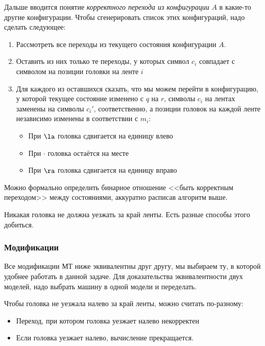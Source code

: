 	Дальше вводится понятие \textit{корректного перехода из конфигурации} $A$ в какие-то другие конфигурации.
	Чтобы сгенерировать список этих конфигураций, надо сделать следующее:
	\begin{enumerate}
		\item Рассмотреть все переходы из текущего состояния конфигурации $A$.
		\item Оставить из них только те переходы, у которых символ $c_i$ совпадает с символом на позиции головки на ленте $i$
		\item
			Для каждого из оставшихся сказать, что мы можем перейти в конфигурацию, у которой текущее состояние изменено с $q$ на $r$,
			символы $c_i$ на лентах заменены на символы $c_i'$, соответственно, а позиции головок на каждой ленте независимо изменены в соответствии с $m_i$:
			\begin{itemize}
				\item При $\la$ головка сдвигается на единицу влево
				\item При $\cdot$ головка остаётся на месте
				\item При $\ra$ головка сдвигается на единицу вправо
			\end{itemize}
	\end{enumerate}
	\begin{Rem}
		Можно формально определить бинарное отношение <<быть корректным переходом>> между состояниями,
		аккуратно расписав алгоритм выше.
	\end{Rem}
	\begin{Rem}
		Никакая головка не должна уезжать за край ленты.
		Есть разные способы этого добиться.
	\end{Rem}

\subsubsection{Модификации}
	Все модификации МТ ниже эквивалентны друг другу, мы выбираем ту, в которой удобнее работать в данной задаче.
	Для доказательства эквивалентности двух моделей, надо выбрать машину в одной модели и переделать.

	Чтобы головка не уезжала налево за край ленты, можно считать по-разному:
	\begin{itemize}
		\item Переход, при котором головка уезжает налево некорректен
		\item Если головка уезжает налево, вычисление прекращается.
	\end{itemize}

